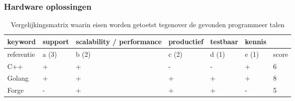 \subsubsection{Hardware oplossingen}

\begin{table}[bh]
\caption{Vergelijkingsmatrix waarin eisen worden getoetst tegenover de gevonden programmeer talen}
\label{tab:matrix_hardware}
\begin{tabular}{|p{3cm}|l|l|l|l|l|l|}
\hline
keyword    & support & scalability / performance & productief & testbaar & kennis &       \\ \hline
referentie & a (3)   & b (2)                     & c (2)      & d (1)    & e (1)  & score \\ \hline
C++        & +       & +                         & -          & -        & +      & 6     \\ \hline
Golang     & +       & +                         & +          & +        & +      & 8     \\ \hline
Forge      & -       & +                         & +          & +        & -      & 5     \\ \hline
\end{tabular}
\end{table}
